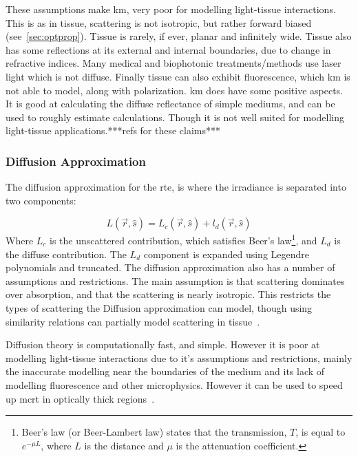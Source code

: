 These assumptions make \gls{km}, very poor for modelling light-tissue interactions. This is as in tissue, scattering is not isotropic, but rather forward biased (see~\cref{sec:optprop}). Tissue is rarely, if ever, planar and infinitely wide. Tissue also has some reflections at its external and internal boundaries, due to change in refractive indices. Many medical and biophotonic treatments/methods use laser light which is not diffuse. Finally tissue can also exhibit fluorescence, which \gls{km} is not able to model, along with polarization. 
\Gls{km} does have some positive aspects. It is good at calculating the diffuse reflectance of simple mediums, and can be used to roughly estimate calculations. Though it is not well suited for modelling light-tissue applications.***refs for these claims***

\subsubsection*{Diffusion Approximation}
The diffusion approximation for the \gls{rte}, is where the irradiance is separated into two components:

\begin{equation}
	L(\vec{r},\hat{s}) = L_c(\vec{r},\hat{s}) +l_d(\vec{r},\hat{s})
\end{equation}
Where $L_c$ is the unscattered contribution, which satisfies Beer's law\footnote{Beer's law (or Beer-Lambert law) states that the transmission, $T$, is equal to $e^{-\mu L}$, where $L$ is the distance and $\mu$ is the attenuation coefficient.}, and $L_d$ is the diffuse contribution. The $L_d$ component is expanded using Legendre polynomials and truncated. 
The diffusion approximation also has a number of assumptions and restrictions. The main assumption is that scattering dominates over absorption, and that the scattering is nearly isotropic. This restricts the types of scattering the Diffusion approximation can model, though using similarity relations can partially model scattering in tissue~\cite{graaff1993similarity,yoon1989accuracies}.

Diffusion theory is computationally fast, and simple. However it is poor at modelling light-tissue interactions due to it's assumptions and restrictions, mainly the inaccurate modelling near the boundaries of the medium and its lack of modelling fluorescence and other microphysics. However it can be used to speed up \gls{mcrt} in optically thick regions~\cite{robitaille2010modified,min2009radiative}.

